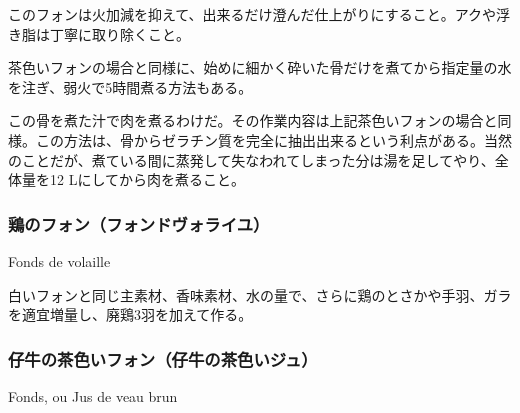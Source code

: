 \begin{recette}
このフォンは火加減を抑えて、出来るだけ澄んだ仕上がりにすること。アクや浮き脂は丁寧に取り除くこと。

茶色いフォンの場合と同様に、始めに細かく砕いた骨だけを煮てから指定量の水を注ぎ、弱火で5時間煮る方法もある。

この骨を煮た汁で肉を煮るわけだ。その作業内容は上記茶色いフォンの場合と同様。この方法は、骨からゼラチン質を完全に抽出出来るという利点がある。当然のことだが、煮ている間に蒸発して失なわれてしまった分は湯を足してやり、全体量を12
Lにしてから肉を煮ること。

\atoaki{}

\hypertarget{fonds-de-volaille}{%
\subsubsection{鶏のフォン（フォンドヴォライユ）}\label{fonds-de-volaille}}

\begin{frsubenv}

Fonds de volaille

\end{frsubenv}

 

白いフォンと同じ主素材、香味素材、水の量で、さらに鶏のとさかや手羽、ガラを適宜増量し、廃鶏3羽を加えて作る。

\atoaki{}

\hypertarget{jus-de-veau-brun}{%
\subsubsection{仔牛の茶色いフォン（仔牛の茶色いジュ）}\label{jus-de-veau-brun}}

\begin{frsubenv}

Fonds, ou Jus de veau brun

\end{frsubenv}



\end{recette}
